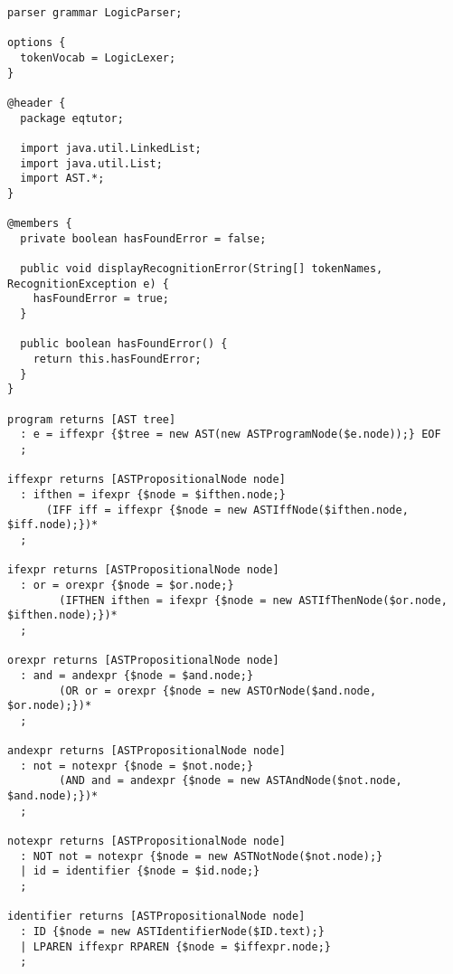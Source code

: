 \documentclass[12pt]{article}
\begin{document}
\begin{verbatim}
parser grammar LogicParser;

options {
  tokenVocab = LogicLexer;
}

@header {
  package eqtutor;

  import java.util.LinkedList;
  import java.util.List;
  import AST.*;
}

@members {
  private boolean hasFoundError = false;

  public void displayRecognitionError(String[] tokenNames, RecognitionException e) {
    hasFoundError = true;
  }

  public boolean hasFoundError() {
    return this.hasFoundError;
  }
}

program returns [AST tree]
  : e = iffexpr {$tree = new AST(new ASTProgramNode($e.node));} EOF
  ;

iffexpr returns [ASTPropositionalNode node]
  : ifthen = ifexpr {$node = $ifthen.node;} 
	  (IFF iff = iffexpr {$node = new ASTIffNode($ifthen.node, $iff.node);})*
  ;
  	
ifexpr returns [ASTPropositionalNode node]
  : or = orexpr {$node = $or.node;} 
		(IFTHEN ifthen = ifexpr {$node = new ASTIfThenNode($or.node, $ifthen.node);})*
  ;

orexpr returns [ASTPropositionalNode node]
  : and = andexpr {$node = $and.node;} 
		(OR or = orexpr {$node = new ASTOrNode($and.node, $or.node);})*
  ;

andexpr returns [ASTPropositionalNode node]
  : not = notexpr {$node = $not.node;} 
		(AND and = andexpr {$node = new ASTAndNode($not.node, $and.node);})*
  ;

notexpr returns [ASTPropositionalNode node]
  : NOT not = notexpr {$node = new ASTNotNode($not.node);}
  | id = identifier {$node = $id.node;}
  ;

identifier returns [ASTPropositionalNode node]
  : ID {$node = new ASTIdentifierNode($ID.text);}
  | LPAREN iffexpr RPAREN {$node = $iffexpr.node;}
  ;
\end{verbatim}
\end{document}
